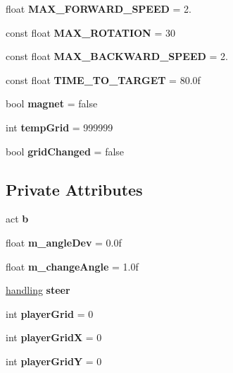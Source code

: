 \begin{DoxyCompactItemize}
float {\bfseries M\+A\+X\+\_\+\+F\+O\+R\+W\+A\+R\+D\+\_\+\+S\+P\+E\+ED} = 2.
\item 
\mbox{\label{class_worker_a57bdb01b44c8f7eff6e42b7532002a25}} 
const float {\bfseries M\+A\+X\+\_\+\+R\+O\+T\+A\+T\+I\+ON} = 30
\item 
\mbox{\label{class_worker_ad4170242cad3938fbb6da129dae662a0}} 
const float {\bfseries M\+A\+X\+\_\+\+B\+A\+C\+K\+W\+A\+R\+D\+\_\+\+S\+P\+E\+ED} = 2.
\item 
\mbox{\label{class_worker_a32a8bc96b895c1281eaee0ecdf9dbfcc}} 
const float {\bfseries T\+I\+M\+E\+\_\+\+T\+O\+\_\+\+T\+A\+R\+G\+ET} = 80.\+0f
\item 
\mbox{\label{class_worker_abfd53664f71851bd04d939203cdb7ac5}} 
bool {\bfseries magnet} = false
\item 
\mbox{\label{class_worker_a6e59079e590245001b6f352ca359144b}} 
int {\bfseries temp\+Grid} = 999999
\item 
\mbox{\label{class_worker_accb0a2bf848c733a98a589e270ace38e}} 
bool {\bfseries grid\+Changed} = false
\end{DoxyCompactItemize}
\subsection*{Private Attributes}
\begin{DoxyCompactItemize}
\item 
\mbox{\label{class_worker_a6fb7cdf697fcbc7dc30b000e39ec414f}} 
act {\bfseries b}
\item 
\mbox{\label{class_worker_a11f0037019ff2cca6dbddc31da784738}} 
float {\bfseries m\+\_\+angle\+Dev} = 0.\+0f
\item 
\mbox{\label{class_worker_a1e7c4e21264504d441dba25855cfea90}} 
float {\bfseries m\+\_\+change\+Angle} = 1.\+0f
\item 
\mbox{\label{class_worker_a5addc8afceef416fcea7df5613f9a1ff}} 
\mbox{\hyperlink{structhandling}{handling}} {\bfseries steer}
\item 
\mbox{\label{class_worker_a4358744600aeda087d8d1f8e49ca9bca}} 
int {\bfseries player\+Grid} = 0
\item 
\mbox{\label{class_worker_ac94e3dee39538d68ac82fab37b391a93}} 
int {\bfseries player\+GridX} = 0
\item 
\mbox{\label{class_worker_aa517ea9cc69027a46bd9d32a70d54ba7}} 
int {\bfseries player\+GridY} = 0
\end{DoxyCompactItemize}


